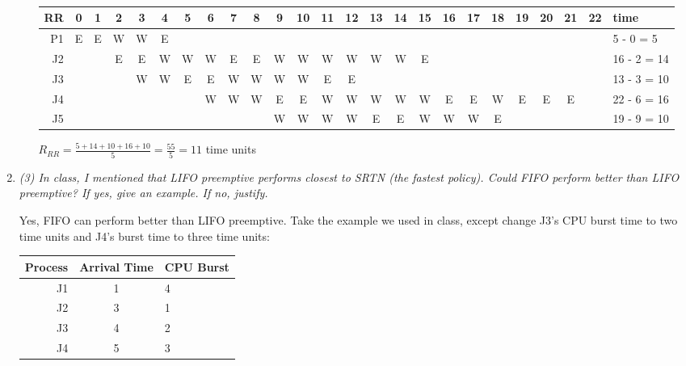 \documentclass[letterpaper,11pt]{article}
\begin{document}
\begin{enumerate}
\begin{enumerate}
\begin{center}\footnotesize
\tiny\tt
  \begin{tabular}{ r || c | c | c | c | c | c | c | c | c | c | c | c | c | c | c | c | c | c | c | c | c | c | c || l }
    \hline
    RR & 0 & 1 & 2 & 3 & 4 & 5 & 6 & 7 & 8 & 9 & 10 & 11 & 12 & 13 & 14 & 15 & 16 & 17 & 18 & 19 & 20 & 21 & 22 & time \\ \hline
    \hline
    P1 & E & E & W & W & E &   &   &   &   &   &    &    &    &    &    &    &    &    &    &    &    &    &    & 5 - 0 = 5 \\ \hline
    J2 &   &   & E & E & W & W & W & E & E & W & W  & W  & W  & W  & W  & E  &    &    &    &    &    &    &    & 16 - 2 = 14 \\ \hline
    J3 &   &   &   & W & W & E & E & W & W & W & W  & E  & E  &    &    &    &    &    &    &    &    &    &    & 13 - 3 = 10 \\ \hline
    J4 &   &   &   &   &   &   & W & W & W & E & E  & W  & W  & W  & W  & W  & E  & E  & W  & E  & E  & E  &    & 22 - 6 = 16 \\ \hline
    J5 &   &   &   &   &   &   &   &   &   & W & W  & W  & W  & E  & E  & W  & W  & W  & E  &    &    &    &    & 19 - 9 = 10 \\ \hline
    \hline
  \end{tabular}
\end{center}
$R_{RR} = \frac{5 + 14 + 10 + 16 + 10}{5} = \frac{55}{5} = 11$ time units
\end{enumerate}
\item \emph{(3) In class, I mentioned that LIFO preemptive performs closest to SRTN (the fastest policy). Could FIFO perform better than LIFO preemptive? If yes, give an example. If no, justify.}

Yes, FIFO can perform better than LIFO preemptive.  Take the example we used in class, except change J3's CPU burst time to two time units and  J4's burst time to three time units:
\begin{center}
  \begin{tabular}{r | c | l }
    Process & Arrival Time & CPU Burst \\ \hline
    \hline
    J1      & 1            & 4 \\ \hline
    J2      & 3            & 1 \\ \hline
    J3      & 4            & 2 \\ \hline
    J4      & 5            & 3 \\ \hline
    \hline
  \end{tabular}
\end{center}


\end{enumerate}
\end{document}
